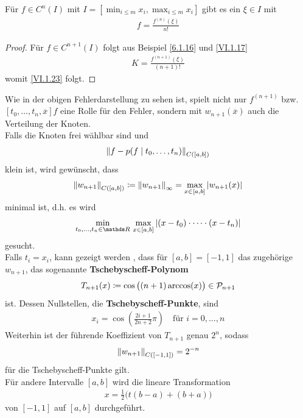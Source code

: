 \begin{Fole}
  Für $f\in C^n(I) $ mit $I=[\min_{i\leq m}x_i, \max_{i\leq m}x_i]$
  gibt es ein $\xi\in I$ mit 
  \begin{gather}
    [t_0,\dots,t_n]f=\frac{f^{(n)}(\xi)}{n!}
    \label{VI.1.23}
  \end{gather}

  \begin{proof}
    Für $f\in C^{n+1}(I)$ folgt aus
    Beispiel \ref{6.1.16} und \eqref{VI.1.17}
    \begin{gather*}
      K= \frac{f^{(n+1)}(\xi)}{(n+1)!}
    \end{gather*}
    womit \eqref{VI.1.23} folgt.
  \end{proof}
\end{Fole}

Wie in der obigen Fehlerdarstellung zu sehen ist,
spielt nicht nur $f^{(n+1)}$ bzw.
$[t_0,\dots,t_n, \overline{x}]f$ eine Rolle für den Fehler,
sondern mit $w_{n+1}(\overline{x})$ auch die Verteilung der Knoten.\\
Falls die Knoten frei wählbar sind und
\begin{gather*}
  \nn[f-p(f\mid t_0,\dots,t_n)]_{C([a,b])}
\end{gather*}
klein ist, wird gewünscht, dass
\begin{gather*}\index{Norm}
  \nn[w_{n+1}]_{C([a,b])}\coloneqq \nn[w_{n+1}]_\infty
  = \max_{x\in[a,b]}|w_{n+1}(x)|
\end{gather*}
minimal ist, d.h.
es wird 
\begin{gather*}
  \min_{t_0,\dots,t_n\in\R}\,\max_{x\in[a,b]}
  |(x-t_0)\cdot\dots\cdot(x-t_n)|
\end{gather*}
gesucht.\\
Falls $t_i=x_i$, kann gezeigt werden 
\cite[z.B.][]{deuflhardhohmann,freundhoppe},
dass für $[a,b]=[-1,1]$ das zugehörige $w_{n+1}$,
das sogenannte
\textbf{Tschebyscheff-Polynom}
\begin{gather}
  T_{n+1}(x)\coloneqq \cos\big((n+1)\arccos(x)\big)\in\p_{n+1}
  \label{VI.1.24}
\end{gather}
ist. Dessen Nullstellen, die 
\textbf{Tschebyscheff-Punkte},
sind
\begin{gather}
  x_i= \cos\left(\frac{2i+1}{2n+2}\pi\right)\quad \text{für } i=0,\dots,n
  \label{VI.1.25}
\end{gather}
Weiterhin ist der führende Koeffizient von $T_{n+1}$ genau $2^n$,
sodass 
\begin{gather}
  \nn[w_{n+1}]_{C([-1,1])}=2^{-n}
  \label{VI.1.26}
\end{gather}
für die Tschebyscheff-Punkte gilt.\\
Für andere Intervalle $[a,b]$ wird die lineare Transformation
\begin{gather*}
  x=\frac{1}{2}\big(t(b-a)+(b+a)\big)
\end{gather*}
von $[-1,1]$ auf $[a,b]$ durchgeführt.

